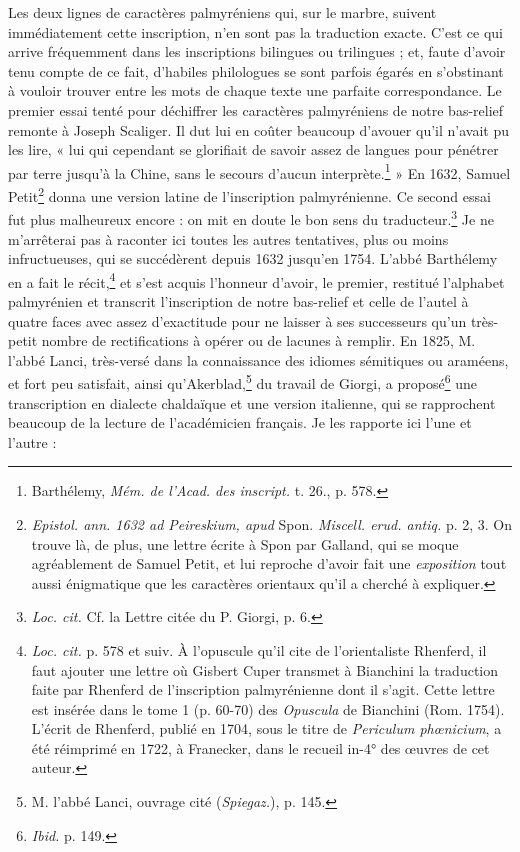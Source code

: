 \documentclass{article}
\begin{document}
Les deux lignes de caractères palmyréniens qui, sur le marbre, suivent immédiatement cette inscription, n'en sont pas la traduction exacte. C'est ce qui arrive fréquemment dans les inscriptions bilingues ou trilingues ; et, faute d'avoir tenu compte de ce fait, d'habiles philologues se sont parfois égarés en s'obstinant à vouloir trouver entre les mots de chaque texte une parfaite correspondance. Le premier essai tenté pour déchiffrer les caractères palmyréniens de notre bas-relief remonte à Joseph Scaliger. Il dut lui en coûter beaucoup d'avouer qu'il n'avait pu les lire, « lui qui cependant se glorifiait de savoir assez de langues pour pénétrer par terre jusqu'à la Chine, sans le secours d'aucun interprète.\footnote{Barthélemy, \emph{Mém. de l'Acad. des inscript.} t. 26., p. 578.} » En 1632, Samuel Petit\footnote{\emph{Epistol. ann. 1632 ad Peireskium, apud} Spon. \emph{Miscell. erud. antiq.} p. 2, 3. On trouve là, de plus, une lettre écrite à Spon par Galland, qui se moque agréablement de Samuel Petit, et lui reproche d'avoir fait une \emph{exposition} tout aussi énigmatique que les caractères orientaux qu'il a cherché à expliquer.} donna une version latine de l'inscription palmyrénienne. Ce second essai fut plus malheureux encore : on mit en doute le bon sens du traducteur.\footnote{\emph{Loc. cit.} Cf. la Lettre citée du P. Giorgi, p. 6.} Je ne m'arrêterai pas à raconter ici toutes les autres tentatives, plus ou moins infructueuses, qui se succédèrent depuis 1632 jusqu'en 1754. L'abbé Barthélemy en a fait le récit,\footnote{\emph{Loc. cit.} p. 578 et suiv. À l'opuscule qu'il cite de l'orientaliste Rhenferd, il faut ajouter une lettre où Gisbert Cuper transmet à Bianchini la traduction faite par Rhenferd de l'inscription palmyrénienne dont il s'agit. Cette lettre est insérée dans le tome 1 (p. 60-70) des \emph{Opuscula} de Bianchini (Rom. 1754). L'écrit de Rhenferd, publié en 1704, sous le titre de \emph{Periculum phœnicium}, a été réimprimé en 1722, à Franecker, dans le recueil in-4° des œuvres de cet auteur.} et s'est acquis l'honneur d'avoir, le premier, restitué l'alphabet palmyrénien et transcrit l'inscription de notre bas-relief et celle de l'autel à quatre faces avec assez d'exactitude pour ne laisser à ses successeurs qu'un très-petit nombre de rectifications à opérer ou de lacunes à remplir. En 1825, M. l'abbé Lanci, très-versé dans la connaissance des idiomes sémitiques ou araméens, et fort peu satisfait, ainsi qu'Akerblad,\footnote{M. l'abbé Lanci, ouvrage cité (\emph{Spiegaz.}), p. 145.} du travail de Giorgi, a proposé\footnote{\emph{Ibid.} p. 149.} une transcription en dialecte chaldaïque et une version italienne, qui se rapprochent beaucoup de la lecture de l'académicien français. Je les rapporte ici l'une et l'autre :
\end{document}
